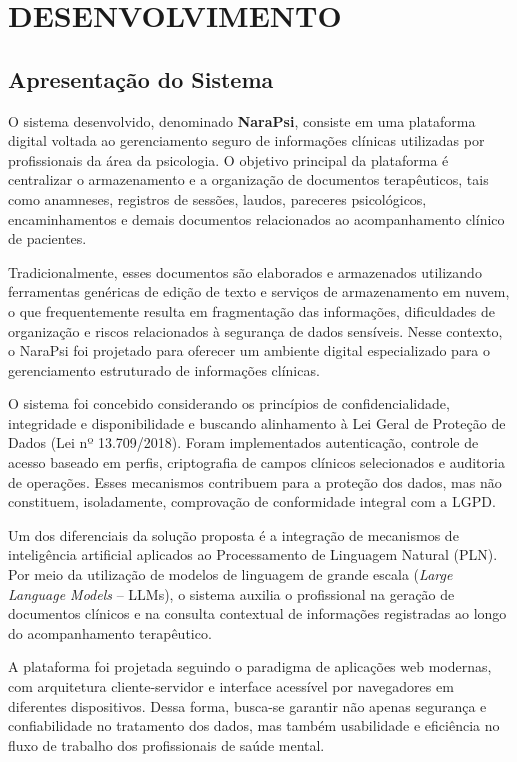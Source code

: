\chapter{DESENVOLVIMENTO}

\section{Apresentação do Sistema}

O sistema desenvolvido, denominado \textbf{NaraPsi}, consiste em uma plataforma digital voltada ao gerenciamento seguro de informações clínicas utilizadas por profissionais da área da psicologia. O objetivo principal da plataforma é centralizar o armazenamento e a organização de documentos terapêuticos, tais como anamneses, registros de sessões, laudos, pareceres psicológicos, encaminhamentos e demais documentos relacionados ao acompanhamento clínico de pacientes.

Tradicionalmente, esses documentos são elaborados e armazenados utilizando ferramentas genéricas de edição de texto e serviços de armazenamento em nuvem, o que frequentemente resulta em fragmentação das informações, dificuldades de organização e riscos relacionados à segurança de dados sensíveis. Nesse contexto, o NaraPsi foi projetado para oferecer um ambiente digital especializado para o gerenciamento estruturado de informações clínicas.

O sistema foi concebido considerando os princípios de confidencialidade, integridade e disponibilidade e buscando alinhamento à Lei Geral de Proteção de Dados (Lei nº 13.709/2018). Foram implementados autenticação, controle de acesso baseado em perfis, criptografia de campos clínicos selecionados e auditoria de operações. Esses mecanismos contribuem para a proteção dos dados, mas não constituem, isoladamente, comprovação de conformidade integral com a LGPD.

Um dos diferenciais da solução proposta é a integração de mecanismos de inteligência artificial aplicados ao Processamento de Linguagem Natural (PLN). Por meio da utilização de modelos de linguagem de grande escala (\textit{Large Language Models} -- LLMs), o sistema auxilia o profissional na geração de documentos clínicos e na consulta contextual de informações registradas ao longo do acompanhamento terapêutico.

A plataforma foi projetada seguindo o paradigma de aplicações web modernas, com arquitetura cliente-servidor e interface acessível por navegadores em diferentes dispositivos. Dessa forma, busca-se garantir não apenas segurança e confiabilidade no tratamento dos dados, mas também usabilidade e eficiência no fluxo de trabalho dos profissionais de saúde mental.

